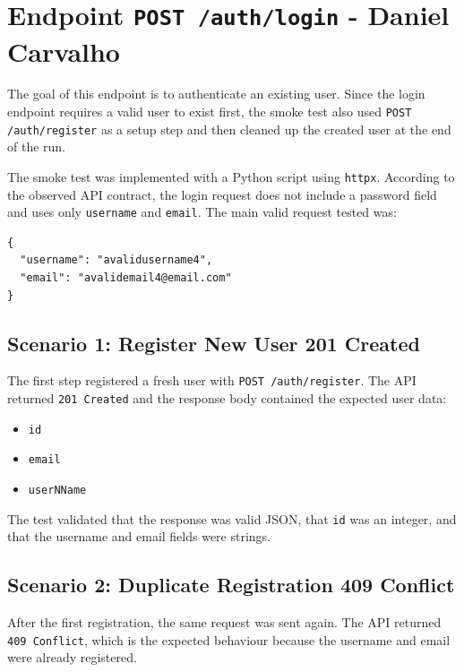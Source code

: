 \section{Endpoint \texttt{POST /auth/login} - Daniel Carvalho}

The goal of this endpoint is to authenticate an existing user. Since the login endpoint requires a valid user to exist first, the smoke test also used \texttt{POST /auth/register} as a setup step and then cleaned up the created user at the end of the run.

The smoke test was implemented with a Python script using \texttt{httpx}. According to the observed API contract, the login request does not include a password field and uses only \texttt{username} and \texttt{email}. The main valid request tested was:

\begin{verbatim}
{
  "username": "avalidusername4",
  "email": "avalidemail4@email.com"
}
\end{verbatim}

\subsection{Scenario 1: Register New User 201 Created}

The first step registered a fresh user with \texttt{POST /auth/register}. The API returned \texttt{201 Created} and the response body contained the expected user data:

\begin{itemize}
    \item \texttt{id}
    \item \texttt{email}
    \item \texttt{userNName}
\end{itemize}

The test validated that the response was valid JSON, that \texttt{id} was an integer, and that the username and email fields were strings.

\subsection{Scenario 2: Duplicate Registration 409 Conflict}

After the first registration, the same request was sent again. The API returned \texttt{409 Conflict}, which is the expected behaviour because the username and email were already registered.

\newpage 

